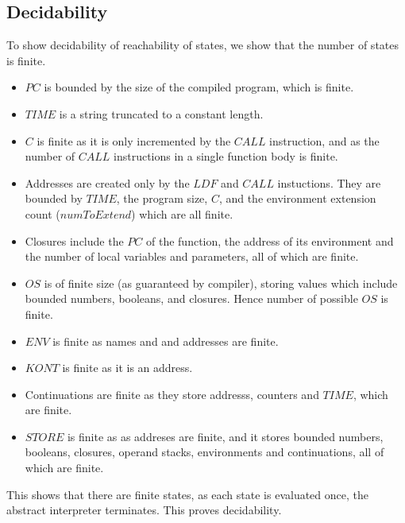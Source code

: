 \documentclass[12pt]{article}
\begin{document}
\subsection{Decidability}
To show decidability of reachability of states, we show that the number of states is finite. 
\begin{itemize}
  \item $PC$ is bounded by the size of the compiled program, which is finite.
        
  \item $TIME$ is a string truncated to a constant length.
        
  \item $C$ is finite as it is only incremented by the $CALL$ instruction, and as the number of $CALL$ instructions in a single function body is finite.
        
  \item Addresses are created only by the $LDF$ and $CALL$ instuctions. They are bounded by $TIME$, the program size, $C$, and the environment extension count ($numToExtend$) which are all finite.
        
  \item Closures include the $PC$ of the function, the address of its environment and the number of local variables and parameters, all of which are finite.
        
  \item $OS$ is of finite size (as guaranteed by compiler), storing values which include bounded numbers, booleans, and closures. Hence number of possible $OS$ is finite.
        
  \item $ENV$ is finite as names and and addresses are finite.
        
  \item $KONT$ is finite as it is an address.
        
  \item Continuations are finite as they store addresss, counters and $TIME$, which are finite.
        
  \item $STORE$ is finite as as addreses are finite, and it stores bounded numbers, booleans, closures, operand stacks, environments and continuations, all of which are finite.
\end{itemize}

This shows that there are finite states, as each state is evaluated once, the abstract interpreter terminates. This proves decidability.
\end{document}
